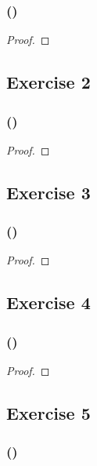\documentclass[14pt]{extarticle}
\begin{document}
\subsubsection{()}

\begin{proof}

\end{proof}

\subsection{Exercise 2}

\subsubsection{()}

\begin{proof}

\end{proof}

\subsection{Exercise 3}

\subsubsection{()}

\begin{proof}

\end{proof}

\subsection{Exercise 4}

\subsubsection{()}

\begin{proof}

\end{proof}

\subsection{Exercise 5}

\subsubsection{()}
\end{document}
